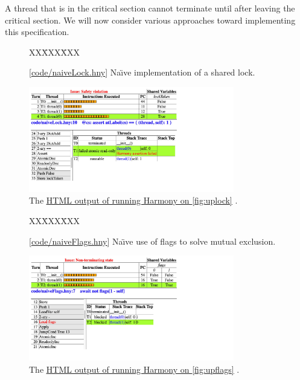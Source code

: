 \documentclass{report}
\newcommand{\harmonysource}[1]{
\begin{tabbing}
XX\=XXX\=XXX\kill
    
\end{tabbing}
}
\newcommand{\harmonylink}[1]{%
[\href{https://harmony.cs.cornell.edu/#1}{\underline{#1}}]%
}
\newcommand{\harmonyref}[2]{%
\href{https://harmony.cs.cornell.edu/output/#1}{\underline{#2}}%
}
\newenvironment{code}{
\tcolorbox
}{
\endtcolorbox
}
\begin{document}
A thread that is in the critical
section cannot terminate until after leaving the critical section.
We will now consider various approaches toward implementing this
specification.

\begin{figure}
\begin{code}
\harmonysource{naiveLock}
\end{code}
\caption{\harmonylink{code/naiveLock.hny} Na\"{\i}ve implementation of a shared lock.}
\label{fig:uplock}
\end{figure}

\begin{figure}
\begin{center}
\includegraphics[width=0.8\textwidth]{figures/naiveLock.pdf}
\end{center}
\caption{The \harmonyref{naiveLock.html}{HTML output of running Harmony on \autoref{fig:uplock}}.}
\label{fig:naiveLockhtml}
\end{figure}

\begin{figure}
\begin{code}
\harmonysource{naiveFlags}
\end{code}
\caption{\harmonylink{code/naiveFlags.hny} Na\"{\i}ve use of flags to solve mutual exclusion.}
\label{fig:upflags}
\end{figure}

\begin{figure}
\begin{center}
\includegraphics[width=0.8\textwidth]{figures/naiveFlags.pdf}
\end{center}
\caption{The \harmonyref{naiveFlags.html}{HTML output of running Harmony on \autoref{fig:upflags}}.}
\label{fig:naiveflagshtml}
\end{figure}
\end{document}
